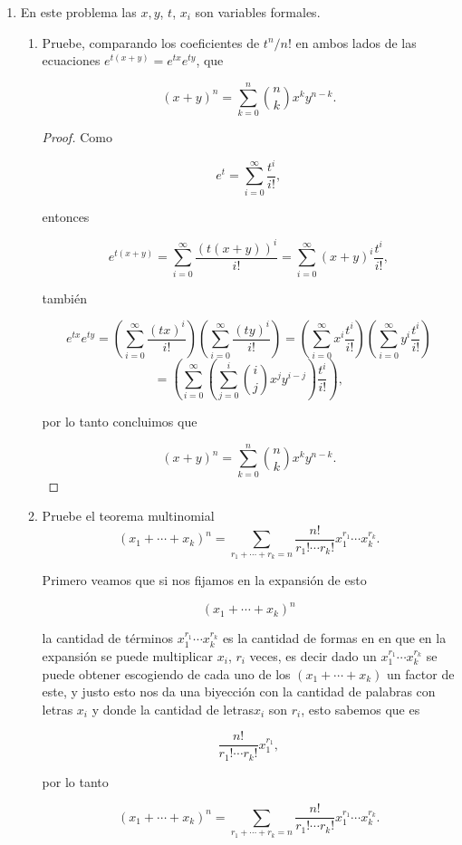 \documentclass[letterpaper]{article}
\newcommand{\pars}[1]{\left( #1 \right) }
\newcommand{\1}{\mathbbm{1}}
\begin{document}
\begin{enumerate}
		\item En este problema las $x, y$, $t$, $x_i$ son variables formales.

		\begin{enumerate}
			\item  Pruebe, comparando los coeficientes de $t^n/n!$ en ambos lados de las ecuaciones $e^{t(x+y)} = e^{tx}e^{ty}$, que 
			
			\[(x+y)^n =\sum^n_{k=0} \binom{n}{k}x^ky^{n-k}.\]
			
			\begin{proof}
				Como

				\[e^t = \sum_{i=0}^\infty \frac{t^i}{i!},\]

				entonces

				\[e^{t(x+y)} = \sum_{i=0}^\infty \frac{\pars{t(x+y)}^i}{i!} = \sum_{i=0}^\infty \pars{x+y}^i\frac{t^i}{i!},\]

				también

				\[e^{tx}e^{ty} = \pars{\sum_{i=0}^\infty \frac{\pars{tx}^i}{i!}} \pars{\sum_{i=0}^\infty \frac{\pars{ty}^i}{i!}} = \pars{\sum_{i=0}^\infty x^i\frac{t^i}{i!}} \pars{\sum_{i=0}^\infty y^i\frac{t^i}{i!}}\]\[ = \pars{\sum_{i=0}^\infty \pars{\sum_{j=0}^i \binom{i}{j}x^jy^{i-j}}\frac{t^i}{i!}},\]

				por lo tanto concluimos que

				\[(x+y)^n =\sum^n_{k=0} \binom{n}{k}x^ky^{n-k}.\]

			\end{proof}

			\item Pruebe el teorema multinomial
			\[(x_1 + \cdots + x_k)^n=\sum_{r_1+\cdots +r_k=n} \frac{n!}	{r_1! \cdots r_k!} x_1^{r_1}\cdots x_k^{r_k}.\]

			Primero veamos que si nos fijamos en la expansión de esto

			\[(x_1 + \cdots + x_k)^n\]

			la cantidad de términos $x_1^{r_1}\cdots x_k^{r_k}$ es la cantidad de formas en en que en la expansión se puede multiplicar $x_i$, $r_i$ veces, es decir dado un $x_1^{r_1}\cdots x_k^{r_k}$ se puede obtener escogiendo de cada uno de los $(x_1 + \cdots + x_k)$ un factor de este, y justo esto nos da una biyección con la cantidad de palabras con letras $x_i$ y donde la cantidad de letras$x_i$ son $r_i$, esto sabemos que es

			\[\frac{n!}	{r_1! \cdots r_k!} x_1^{r_1},\]

			por lo tanto

			\[(x_1 + \cdots + x_k)^n=\sum_{r_1+\cdots +r_k=n} \frac{n!}	{r_1! \cdots r_k!} x_1^{r_1}\cdots x_k^{r_k}.\]


\end{enumerate}
\end{enumerate}
\end{document}
